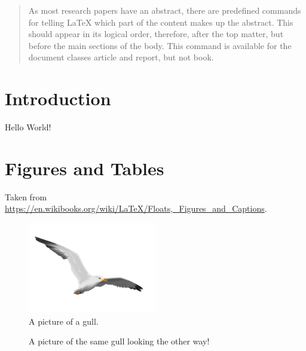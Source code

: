 \documentclass[11pt,a4paper]{article}
\begin{document}
    \begin{abstract}
        As most research papers have an abstract, there are predefined commands for telling LaTeX which part of the content makes up the abstract.
        This should appear in its logical order, therefore, after the top matter, but before the main sections of the body.
        This command is available for the document classes article and report, but not book.
    \end{abstract}

    \section{Introduction}
    Hello World!

    \section{Figures and Tables}
        Taken from \url{https://en.wikibooks.org/wiki/LaTeX/Floats,_Figures_and_Captions}.

        \begin{figure}
          \caption{A picture of a gull.}
          \centering
            \includegraphics[width=0.5\textwidth]{gull}
        \end{figure}

        \begin{figure}
          \centering
          \caption{A picture of the same gull looking the other way!}
        \end{figure}
\end{document}
